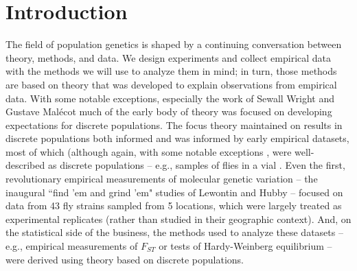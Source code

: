 \documentclass{ar-1col}
\newcommand{\todo}[1]{{\textbf{\color{red}{#1}}}}
\begin{document}
\tableofcontents

\todo{
\begin{itemize}
\item G: go through all references
\item P: make valley scenario map and valley heterozygosity figure
\item P: finishing dispersal section
\item P: finishing flux section
\item P: finishing geographic distribution of ancestry \& co-ancestry \& relative differentiation
\item P: figure of valley scenario (contours of topography (and density) paired with heterozygosity figure
\item P: writeup of postglacial expansion scenario
\item G: tying expansion scenario into ``groups" section
\item both: make annotated spatial popgen bibliography
\item G: identifiability and ill-posedness section
\item both: reiterate motivation throughout - no one's written down the quantities we're trying to estimate (e.g., what's migration rate w/out populations, what's analogous to admixture proportions if we don't have discrete groups)
\end{itemize}
}

\section{Introduction}
\todo{read through and edit}

The field of population genetics is shaped by a continuing conversation
between theory, methods, and data.
We design experiments and collect empirical data
with the methods we will use to analyze them in mind;
in turn, those methods are based on theory
that was developed to explain observations from empirical data.
With some notable exceptions,
especially the work of Sewall Wright \citep{Wright1940,Wright1943,wright1946isolation}
and Gustave Mal\'ecot \citep{malecot}
much of the early body of theory was focused on
developing expectations for discrete populations.
The focus theory maintained on results in discrete populations
both informed and was informed by early empirical datasets,
most of which
(although again,
with some notable exceptions \citep[e.g.,][]{Dobzhansky_Wright1943, dobzhansky1947},
were well-described as discrete populations --
e.g., samples of flies in a vial \citep{lewontin1974}.
Even the first, revolutionary empirical measurements
of molecular genetic variation
-- the inaugural ``find 'em and grind 'em" studies of Lewontin and Hubby \citep{HubbyLewontin66,LewontinHubby66} --
focused on data from 43 fly strains sampled from 5 locations,
which were largely treated as experimental replicates
(rather than studied in their geographic context).
And, on the statistical side of the business,
the methods used to analyze these datasets --
e.g., empirical measurements of $F_{ST}$ \citep{Wright1951}
or tests of Hardy-Weinberg equilibrium \citep{hardy1908,weinberg1908} --
were derived using theory based on discrete populations.
\end{document}
